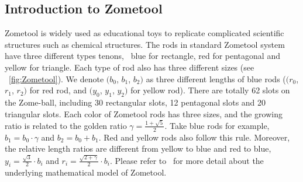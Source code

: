 \subsection{Introduction to Zometool}
Zometool is widely used as educational toys to replicate complicated scientific structures such as chemical structures. 
The rods in standard Zometool system have three different types tenons, \ie~blue for rectangle, red for pentagonal and yellow for triangle.
Each type of rod also has three different sizes (see \figname~\ref{fig:Zometool}).
We denote $(b_0$, $b_1$, $b_2)$ as three different lengths of blue rods ($(r_0$, $r_1$, $r_2)$ for red rod, and $(y_0$, $y_1$, $y_2)$ for yellow rod).
There are totally 62 slots on the Zome-ball, including 30 rectangular slots, 12 pentagonal slots and 20 triangular slots. 
Each color of Zometool rods has three sizes, and the growing ratio is related to the golden ratio $\gamma = \frac{1+\sqrt{5}}{2}$. 
Take blue rods for example, $b_1 = b_0 \cdot \gamma$ and $b_2 = b_0 + b_1$. 
Red and yellow rods also follow this rule. 
Moreover, the relative length ratios are different from yellow to blue and red to blue, \ie~ $y_i = \frac{\sqrt{3}}{2} \cdot b_i$ and $r_i = \frac{\sqrt{2 + \gamma}}{2} \cdot b_i$.
Please refer to~\cite{davis2007mathematics} for more detail about the underlying mathematical model of Zometool.


